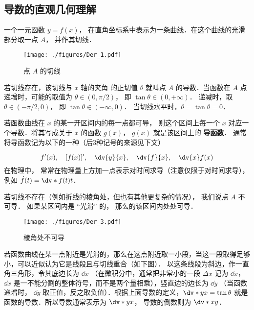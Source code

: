 

\subsection{导数的直观几何理解}

一个一元函数 $y = f(x)$， 在直角坐标系中表示为一条曲线．在这个曲线的光滑部分取一点 $A$， 并作其切线．

\begin{figure}[ht]
\centering
\texttt{[image: ./figures/Der\_1.pdf]}
\caption{点 $A$ 的切线}
\end{figure}


若切线存在，该切线与 $x$ 轴的夹角 的正切值 $\theta$ 就叫点 $A$ 的导数．当函数在 $A$ 点递增时，可能的取值为 $\theta \in (0,\pi/2)$， 即 $\tan \theta  \in (0, + \infty)$． 递减时，取 $\theta  \in (-\pi/2,0)$， 即 $\tan \theta \in (-\infty ,0)$． 当切线水平时，$\theta  = \tan \theta  = 0$． 

若函数曲线在 $x$ 的某一开区间内的每一点都可导， 则这个区间上每一个 $x$ 对应一个导数．将其写成关于 $x$ 的函数 $g(x)$，  $g(x)$  就是该区间上的 \textbf{导函数}． 通常将导函数记为以下的一种（后3种记号的来源见下文）

\begin{equation}\label{Der_eq1}
f'(x),\quad [f(x)]',\quad \dv{y}{x},\quad \dv{f}{x},\quad \dv{x}f(x)
\end{equation}
在物理中， 常常在物理量上方加一点表示对时间求导（注意仅限于对时间求导）， 例如 $\dot f(t) = \dv*{f(t)}{t}$．

若切线不存在（例如折线的棱角处，但也有其他更复杂的情况）， 我们说点 $A$ 不可导． 如果某区间内是 “光滑” 的， 那么的该区间内处处可导．

\begin{figure}[ht]
\centering
\texttt{[image: ./figures/Der\_3.pdf]}
\caption{棱角处不可导}
\end{figure}

若函数曲线在某一点附近是光滑的，那么在这点附近取一小段，当这一段取得足够小，可以近似认为它是线段且与切线重合（如下图）． 以这条线段为斜边，作一直角三角形，令其底边长为 $\dd{x}$ （在微积分中，通常把非常小的一段 $\Delta x$ 记为 $\dd{x}$，  $\dd{x}$ 是一不能分割的整体符号，而不是两个量相乘），竖直边的边长为 $\dd{y}$ （当函数递增时， $\dd{y}$ 取正值，反之取负值）．根据上面导数的定义，$\dv*{y}{x} = \tan \theta $ 就是函数的导数．所以导数通常表示为 $\dv*{y}{x}$， 导数的倒数则为 $\dv*{x}{y}$． 

